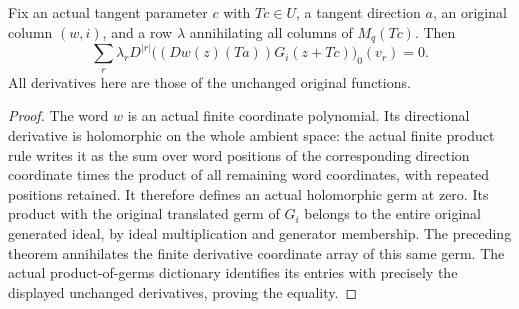 \begin{theorem}
\label{hir:actual-macaulay-annihilator-word-correction-zero}
\leanok
Fix an actual tangent parameter $c$ with $Tc\in U$, a tangent direction
$a$, an original column $(w,i)$, and a row $\lambda$ annihilating all
columns of $M_q(Tc)$. Then
\[
 \sum_r\lambda_r D^{|r|}
 \bigl((Dw(z)(Ta))G_i(z+Tc)\bigr)_0(v_r)=0.
\]
All derivatives here are those of the unchanged original functions.
\end{theorem}
\begin{proof}
The word $w$ is an actual finite coordinate polynomial. Its directional
derivative is holomorphic on the whole ambient space: the actual
finite product rule writes it as the sum over word positions of the
corresponding direction coordinate times the product of all remaining
word coordinates, with repeated positions retained. It therefore
defines an actual holomorphic germ at zero. Its product with the
original translated germ of $G_i$ belongs to the entire original
generated ideal, by ideal multiplication and generator membership.
The preceding theorem annihilates the finite derivative coordinate
array of this same germ. The actual product-of-germs dictionary
identifies its entries with precisely the displayed unchanged
derivatives, proving the equality.
\end{proof}


